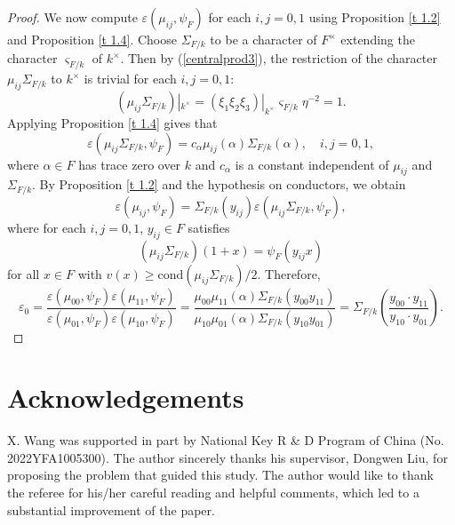 \documentclass[12pt]{amsart}
\theoremstyle{Theorem}
\theoremstyle{Theorem}
\theoremstyle{Theorem}
\theoremstyle{Theorem}
\theoremstyle{Plain}
\theoremstyle{remark}
\theoremstyle{remark}
\theoremstyle{Definition}
\begin{document}
\begin{proof}
    We now compute $ \varepsilon( \mu_{ij}, \psi_F ) $ for each $ i, j = 0, 1 $ using Proposition \ref{t 1.2} and Proposition \ref{t 1.4}. Choose $\Sigma_{F/k}$ to be a character of $F^\times$ extending the character $\varsigma_{F/k}$ of $k^\times$. Then by (\ref{centralprod3}), the restriction of the character $\mu_{ij}\Sigma_{F/k}$ to $k^\times$ is trivial for each $ i, j = 0, 1 $:
    \[
        ( \mu_{ij} \Sigma_{F/k} )|_{ k^\times } =( \xi_1 \xi_2 \xi_3 )|_{ k^\times } \varsigma_{ F/k } \eta^{-2} = 1.
    \]
    Applying Proposition \ref{t 1.4} gives that 
    \[
        \varepsilon \left( \mu_{ij} \Sigma_{ F/k }, \psi_F \right) = c_{ \alpha } \mu_{ij}( \alpha ) \Sigma_{ F/k }( \alpha ), \quad i, j = 0, 1,
    \]
    where $ \alpha \in F $ has trace zero over $k$ and $c_\alpha$ is a constant independent of $\mu_{ij}$ and $\Sigma_{F/k}$. By Proposition \ref{t 1.2} and the hypothesis on conductors, we obtain
    \[
        \varepsilon \left( \mu_{ij}, \psi_F \right) = \Sigma_{F/k}( y_{ij} ) \varepsilon \left( \mu_{ij} \Sigma_{ F/k }, \psi_F \right),
    \]
    where for each $ i, j = 0, 1 $, $ y_{ij} \in F $ satisfies
    \[
        \left( \mu_{ij} \Sigma_{F/k} \right) (1 + x) = \psi_F( y_{ij} x )
    \]
    for all $ x \in F $ with $ v(x) \ge \mathrm{cond} \left( \mu_{ij} \Sigma_{ F/k } \right) / 2 $. Therefore,
    \[  
        \varepsilon_0 = \frac{ \varepsilon \left( \mu_{00}, \psi_F \right) \varepsilon \left( \mu_{11}, \psi_F \right) }{ \varepsilon \left( \mu_{01}, \psi_F \right) \varepsilon \left( \mu_{10}, \psi_F \right) } = \frac{ \mu_{00} \mu_{11}( \alpha ) \Sigma_{ F/k }( y_{00} y_{11} ) }{ \mu_{10} \mu_{01} ( \alpha ) \Sigma_{ F/k }( y_{10} y_{01} ) } = \Sigma_{ F/k } \left( \frac{ y_{00} \cdot y_{11} }{ y_{10} \cdot y_{01} } \right).
    \]
\end{proof}

\section*{Acknowledgements}

X. Wang was supported in part by National Key R \& D Program of China (No. 2022YFA1005300). The author sincerely thanks his supervisor, Dongwen Liu, for proposing the problem that guided this study.
The author would like to thank the referee for his/her careful reading and helpful comments, which led to a substantial improvement of the paper.
\end{document}
